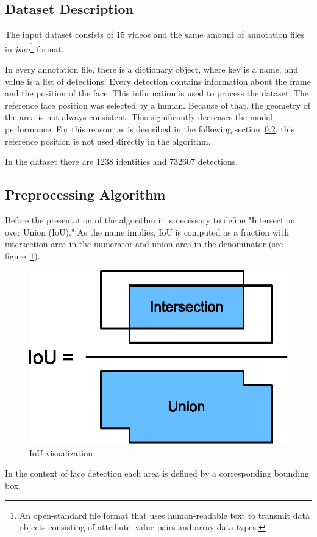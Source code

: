 \subsection{Dataset Description}\label{subsec:dataset-description}
The input dataset consists of 15 videos and the same amount of annotation files in \textit{json}\footnote{An
open-standard file format that uses human-readable text to transmit data objects consisting of attribute–value pairs
and array data types.} format.

In every annotation file, there is a dictionary object, where key is a name, and value is a list of detections.
Every detection contains information about the frame and the position of the face.
This information is used to process the dataset.
The reference face position was selected by a human.
Because of that, the geometry of the area is not always consistent.
This significantly decreases the model performance.
For this reason, as is described in the following section~\ref{subsec:preproalgo}, this reference position is not
used directly in the algorithm.

In the dataset there are 1238 identities and 732607 detections.

\subsection{Preprocessing Algorithm}\label{subsec:preproalgo}
Before the presentation of the algorithm it is necessary to define "Intersection over Union (IoU)."
As the name implies, IoU is computed as a fraction with intersection area in the numerator and union area in the
denominator (see figure~\ref{fig:iou}).
\begin{figure}[H]
    \centering
    \includegraphics{images/implementation/iou.eps}
    \caption{IoU visualization\cite{IoU}}
    \label{fig:iou}
\end{figure}
In the context of face detection each area is defined by a corresponding bounding box.

